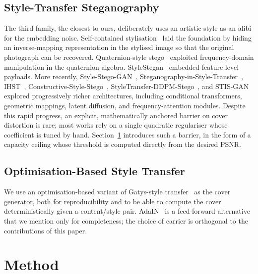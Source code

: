 \documentclass[conference]{IEEEtran}
\begin{document}
\subsection{Style-Transfer Steganography}
The third family, the closest to ours, deliberately uses an artistic style as an alibi for the embedding noise. Self-contained stylisation~\cite{wacv2020} laid the foundation by hiding an inverse-mapping representation in the stylised image so that the original photograph can be recovered. Quaternion-style stego~\cite{quat2021} exploited frequency-domain manipulation in the quaternion algebra. StyleStegan~\cite{stylestegan2023} embedded feature-level payloads. More recently, Style-Stego-GAN~\cite{sstegogan2024}, Steganography-in-Style-Transfer~\cite{sst2024}, IHST~\cite{ihst2024}, Constructive-Style-Stego~\cite{css2024}, StyleTransfer-DDPM-Stego~\cite{sddpm2025}, and STIS-GAN~\cite{stisgan2026} explored progressively richer architectures, including conditional transformers, geometric mappings, latent diffusion, and frequency-attention modules. Despite this rapid progress, an explicit, mathematically anchored barrier on cover distortion is rare; most works rely on a single quadratic regulariser whose coefficient is tuned by hand. Section~\ref{sec:method} introduces such a barrier, in the form of a capacity ceiling whose threshold is computed directly from the desired PSNR.

\subsection{Optimisation-Based Style Transfer}
We use an optimisation-based variant of Gatys-style transfer~\cite{gatys} as the cover generator, both for reproducibility and to be able to compute the cover deterministically given a content/style pair. AdaIN~\cite{adain} is a feed-forward alternative that we mention only for completeness; the choice of carrier is orthogonal to the contributions of this paper.

\section{Method}
\label{sec:method}
\end{document}
